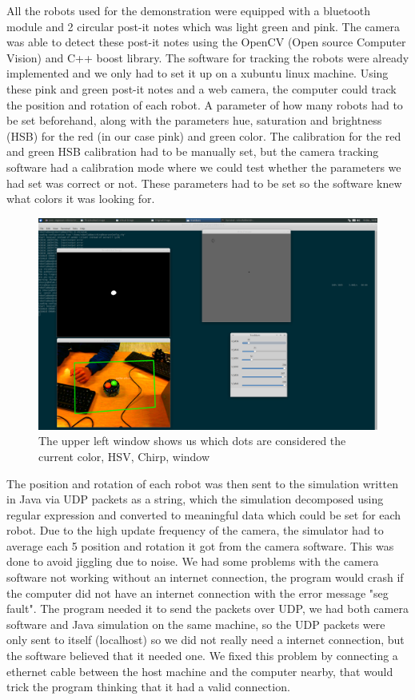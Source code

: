 All the robots used for the demonstration were equipped with a bluetooth module and 2 circular post-it notes which was light green and pink.
The camera was able to detect these post-it notes using the OpenCV (Open source Computer Vision) and C++ boost library. The software for tracking the robots were already implemented and we only had to set it up on a xubuntu linux machine.
Using these pink and green post-it notes and a web camera, the computer could track the position and rotation of each robot. A parameter of how many robots had to be set beforehand, along with the parameters hue, saturation and brightness (HSB) for the red (in our case pink) and green color. The calibration for the red and green HSB calibration had to be manually set, but the camera tracking software had a calibration mode where we could test whether the parameters we had set was correct or not. These parameters had to be set so the software knew what colors it was looking for.
\begin{figure}
\centering
\includegraphics[width=0.8\linewidth]{images/calibration.png}
\caption[calibration of the camera tracking software]{The upper left window shows us which dots are considered the current color, HSV, Chirp, window}
\end{figure}

The position and rotation of each robot was then sent to the simulation written in Java via UDP packets as a string, which the simulation decomposed using regular expression and converted to meaningful data which could be set for each robot. Due to the high update frequency of the camera, the simulator had to average each 5 position and rotation it got from the camera software. This was done to avoid jiggling due to noise. We had some problems with the camera software not working without an internet connection, the program would crash if the computer did not have an internet connection with the error message "seg fault". The program needed it to send the packets over UDP, we had both camera software and Java simulation on the same machine, so the UDP packets were only sent to itself (localhost) so we did not really need a internet connection, but the software believed that it needed one. We fixed this problem by connecting a ethernet cable between the host machine and the computer nearby, that would trick the program thinking that it had a valid connection.

